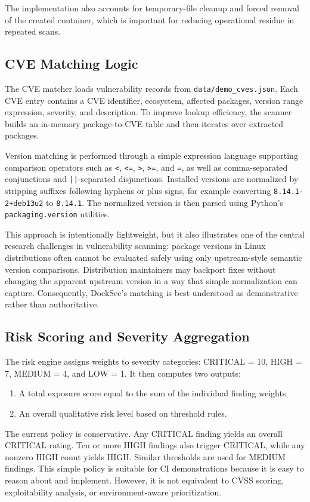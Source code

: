 \documentclass[12pt,draftclsnofoot,onecolumn]{IEEEtran}
\begin{document}
The implementation also accounts for temporary-file cleanup and forced removal of the created container, which is important for reducing operational residue in repeated scans.

\subsection{CVE Matching Logic}
The CVE matcher loads vulnerability records from \texttt{data/demo\_cves.json}. Each CVE entry contains a CVE identifier, ecosystem, affected packages, version range expression, severity, and description. To improve lookup efficiency, the scanner builds an in-memory package-to-CVE table and then iterates over extracted packages.

Version matching is performed through a simple expression language supporting comparison operators such as \texttt{<}, \texttt{<=}, \texttt{>}, \texttt{>=}, and \texttt{=}, as well as comma-separated conjunctions and \texttt{||}-separated disjunctions. Installed versions are normalized by stripping suffixes following hyphens or plus signs, for example converting \texttt{8.14.1-2+deb13u2} to \texttt{8.14.1}. The normalized version is then parsed using Python's \texttt{packaging.version} utilities.

This approach is intentionally lightweight, but it also illustrates one of the central research challenges in vulnerability scanning: package versions in Linux distributions often cannot be evaluated safely using only upstream-style semantic version comparisons. Distribution maintainers may backport fixes without changing the apparent upstream version in a way that simple normalization can capture. Consequently, DockSec's matching is best understood as demonstrative rather than authoritative.

\subsection{Risk Scoring and Severity Aggregation}
The risk engine assigns weights to severity categories: CRITICAL = 10, HIGH = 7, MEDIUM = 4, and LOW = 1. It then computes two outputs:
\begin{enumerate}
  \item A total exposure score equal to the sum of the individual finding weights.
  \item An overall qualitative risk level based on threshold rules.
\end{enumerate}

The current policy is conservative. Any CRITICAL finding yields an overall CRITICAL rating. Ten or more HIGH findings also trigger CRITICAL, while any nonzero HIGH count yields HIGH. Similar thresholds are used for MEDIUM findings. This simple policy is suitable for CI demonstrations because it is easy to reason about and implement. However, it is not equivalent to CVSS scoring, exploitability analysis, or environment-aware prioritization.
\end{document}
